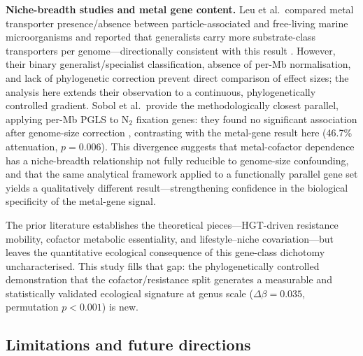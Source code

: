\documentclass[times]{zHenriquesLab-StyleBioRxiv}
\begin{document}
\textbf{Niche-breadth studies and metal gene content.} Leu et al.\ compared metal transporter presence/absence between particle-associated and free-living marine microorganisms and reported that generalists carry more substrate-class transporters per genome---directionally consistent with this result \cite{leu2022}. However, their binary generalist/specialist classification, absence of per-Mb normalisation, and lack of phylogenetic correction prevent direct comparison of effect sizes; the analysis here extends their observation to a continuous, phylogenetically controlled gradient. Sobol et al.\ provide the methodologically closest parallel, applying per-Mb PGLS to N$_2$ fixation genes: they found no significant association after genome-size correction \cite{sobol2026}, contrasting with the metal-gene result here (46.7\% attenuation, $p = 0.006$). This divergence suggests that metal-cofactor dependence has a niche-breadth relationship not fully reducible to genome-size confounding, and that the same analytical framework applied to a functionally parallel gene set yields a qualitatively different result---strengthening confidence in the biological specificity of the metal-gene signal.

The prior literature establishes the theoretical pieces---HGT-driven resistance
mobility, cofactor metabolic essentiality, and lifestyle--niche
covariation---but leaves the quantitative ecological consequence of this
gene-class dichotomy uncharacterised. This study fills that gap: the
phylogenetically controlled demonstration that the cofactor/resistance split
generates a measurable and statistically validated ecological signature at
genus scale ($\Delta\beta = 0.035$, permutation $p < 0.001$) is new.




\subsection{Limitations and future directions}
\label{sec:limitations}
\end{document}
